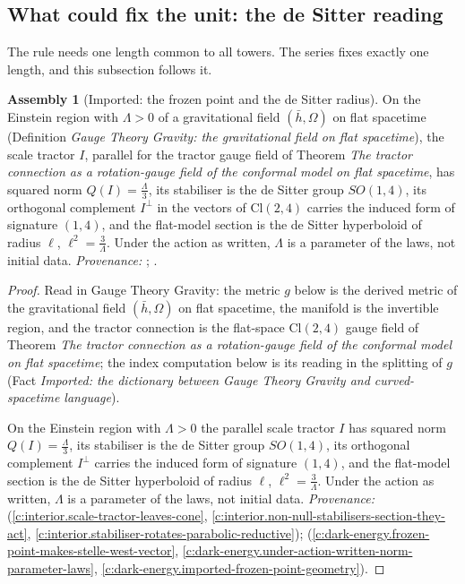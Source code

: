 \documentclass[11pt]{article}
\theoremstyle{definition}
\newtheorem{assembled}[theorem]{Assembly}
\theoremstyle{plain}
\newcommand{\changedmark}[2]{\marginpar{\raggedright\scriptsize\color{#1}#2}}
\providecommand{\Cl}{}\renewcommand{\Cl}{\mathrm{Cl}}
\providecommand{\hb}{}\renewcommand{\hb}{\bar{h}}
\begin{document}
\subsection*{What could fix the unit: the de Sitter reading}
\label{c:note.dark-matter.setting-what-could-fix-unit-de}
The rule needs one length common to all towers. The series fixes exactly one length, and this subsection follows it.

\begin{assembled}[Imported: the frozen point and the de Sitter radius]\label{c:dark-matter.imported-frozen-point-de-sitter-radius}
\changedmark{gray}{reworded}
On the Einstein region with $\Lambda > 0$ of a gravitational field $(\hb, \Omega)$ on flat spacetime (Definition \emph{Gauge Theory Gravity: the gravitational field on flat spacetime}), the scale tractor $I$, parallel for the tractor gauge field of Theorem \emph{The tractor connection as a rotation-gauge field of the conformal model on flat spacetime}, has squared norm $Q(I) = \tfrac{\Lambda}{3}$, its stabiliser is the de Sitter group $SO(1,4)$, its orthogonal complement $I^{\perp}$ in the vectors of $\Cl(2,4)$ carries the induced form of signature $(1,4)$, and the flat-model section is the de Sitter hyperboloid of radius $\ell$, $\ell^{2} = \tfrac{3}{\Lambda}$. Under the action as written, $\Lambda$ is a parameter of the laws, not initial data. \emph{Provenance:} \cite[Thm.~4.7, Prop.~4.10, Prop.~4.4]{ButlerT6}; \cite[Fact~2.1, Thm.~3.1, Prop.~5.8]{ButlerT10}.
\end{assembled}
\begin{proof}
Read in Gauge Theory Gravity: the metric $g$ below is the derived metric of the gravitational field $(\hb, \Omega)$ on flat spacetime, the manifold is the invertible region, and the tractor connection is the flat-space $\Cl(2,4)$ gauge field of Theorem \emph{The tractor connection as a rotation-gauge field of the conformal model on flat spacetime}; the index computation below is its reading in the splitting of $g$ (Fact \emph{Imported: the dictionary between Gauge Theory Gravity and curved-spacetime language}).

On the Einstein region with $\Lambda > 0$ the parallel scale tractor $I$ has squared norm $Q(I) = \tfrac{\Lambda}{3}$, its stabiliser is the de Sitter group $SO(1,4)$, its orthogonal complement $I^{\perp}$ carries the induced form of signature $(1,4)$, and the flat-model section is the de Sitter hyperboloid of radius $\ell$, $\ell^{2} = \tfrac{3}{\Lambda}$. Under the action as written, $\Lambda$ is a parameter of the laws, not initial data. \emph{Provenance:} \cite[Thm.~4.7, Prop.~4.10, Prop.~4.4]{ButlerT6} (\ref{c:interior.scale-tractor-leaves-cone}, \ref{c:interior.non-null-stabilisers-section-they-act}, \ref{c:interior.stabiliser-rotates-parabolic-reductive}); \cite[Fact~2.1, Thm.~3.1, Prop.~5.8]{ButlerT10} (\ref{c:dark-energy.frozen-point-makes-stelle-west-vector}, \ref{c:dark-energy.under-action-written-norm-parameter-laws}, \ref{c:dark-energy.imported-frozen-point-geometry}).

\end{proof}
\end{document}

